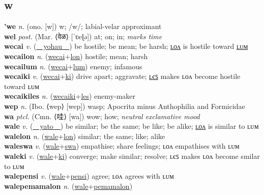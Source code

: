 \subsection{w}

\textbf{'we} \textit{n.} (ono. [w])
w; /w/; labial-velar approximant \label{'we} \\
\textbf{wel} \textit{post.} (Mar. ⟨वेळ⟩ [ˈʋeɭə])
at; on; in; \textit{marks time} \label{wel} \\
\textbf{wecai} \textit{v.} (\hyperref[yohau]{~~yohau~~})
be hostile; be mean; be harsh; \hyperref[wecailon]{ʟᴏᴧ} is hostile toward \hyperref[wecailum]{ʟᴜᴍ} \label{wecai} \\
\textbf{wecailon} \textit{n.} (\hyperref[wecai]{wecai}+\hyperref[lon]{lon})
hostile; mean; harsh \label{wecailon} \\
\textbf{wecailum} \textit{n.} (\hyperref[wecai]{wecai}+\hyperref[lum]{lum})
enemy; infamous \label{wecailum} \\
\textbf{wecaiki} \textit{v.} (\hyperref[wecai]{wecai}+\hyperref[ki]{ki})
drive apart; aggravate; \hyperref[wecaikiles]{ʟєꜱ} makes ʟᴏᴧ become hostile toward ʟᴜᴍ \label{wecaiki} \\
\textbf{wecaikiles} \textit{n.} (\hyperref[wecaiki]{wecaiki}+\hyperref[les]{les})
enemy-maker \label{wecaikiles} \\
\textbf{wep} \textit{n.} (Ibo. ⟨wep⟩ [wep])
wasp; Apocrita minus Anthophilia and Formicidae \label{wep} \\
\textbf{wa} \textit{ptcl.} (Cmn. ⟨哇⟩ [wa])
wow; how; \textit{neutral exclamative mood} \label{wa} \\
\textbf{wale} \textit{v.} (\hyperref[yato]{~~yato~~})
be similar; be the same; be like; be alike; \hyperref[walelon]{ʟᴏᴧ} is similar to ʟᴜᴍ \label{wale} \\
\textbf{walelon} \textit{n.} (\hyperref[wale]{wale}+\hyperref[lon]{lon})
similar; the same; like; alike \label{walelon} \\
\textbf{waleswa} \textit{v.} (\hyperref[wale]{wale}+\hyperref[swa]{swa})
empathise; share feelings; ʟᴏᴧ empathises with ʟᴜᴍ \label{waleswa} \\
\textbf{waleki} \textit{v.} (\hyperref[wale]{wale}+\hyperref[ki]{ki})
converge; make similar; resolve; ʟєꜱ makes ʟᴏᴧ become smilar to ʟᴜᴍ \label{waleki} \\
\textbf{walepensi} \textit{v.} (\hyperref[wale]{wale}+\hyperref[pensi]{pensi})
agree; ʟᴏᴧ agrees with ʟᴜᴍ \label{walepensi} \\
\textbf{walepemamalon} \textit{n.} (\hyperref[wale]{wale}+\hyperref[pemamalon]{pemamalon})
